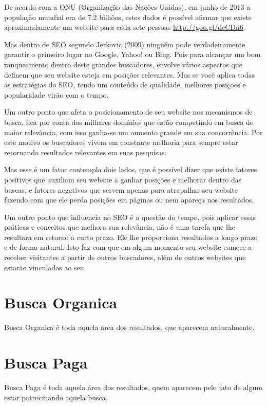 \documentclass[
	12pt,				%
	openright,			%
	twoside,			%
	a4paper,			%
	english,			%
	french,				%
	spanish,			%
	brazil				%
	]{abntex2}
\begin{document}
De acordo com a ONU (Organização das Nações Unidas), em junho de 2013 a população mundial era de 7,2 bilhões, estes dados é possível afirmar que existe aproximadamente um website para cada sete pessoas \url{http://goo.gl/dcCDn6}.

Mas dentro de SEO segundo Jerkovic (2009) ninguém pode verdadeiramente garantir o primeiro lugar no Google, Yahoo! ou Bing. Pois para alcançar um bom ranqueamento dentro deste grandes buscadores, envolve vários aspectos que definem que seu website esteja em posições relevantes. Mas se você aplica todas as estratégias do SEO, tendo um conteúdo de qualidade, melhores posições e popularidade virão com o tempo.

Um outro ponto que afeta o posicionamento de seu website nos mecanismos de busca, fica por conta dos milhares domínios que estão competindo em busca de maior relevância, com isso ganha-se um aumento grande em sua concorrência. Por este motivo os buscadores vivem em constante melhoria para sempre estar retornando resultados relevantes em suas pesquisas.

Mas esse é um fator contempla dois lados, que é possível dizer que existe fatores positivos que auxiliam seu website a ganhar posições e melhorar dentro das buscas, e fatores negativos que servem apenas para atrapalhar seu website fazendo com que ele perda posições em páginas ou nem apareça nos resultados.

Um outro ponto que influencia no SEO é a questão do tempo, pois aplicar essas práticas e conceitos que melhora sua relevância, não é uma tarefa que lhe resultara em retorno a curto prazo. Ele lhe proporciona resultados a longo prazo e de forma natural. Isto faz com que em algum momento seu website comece a receber visitantes a partir de outros buscadores, além de outros websites que estarão vinculados ao seu. 

\section{Busca Organica}

Busca Organica é toda aquela área dos resultados, que aparecem naturalmente.

\section{Busca Paga}

Busca Paga é toda aquela área dos resultados, quem aparecem pelo fato de algum estar patrocinando aquela busca.
\end{document}
